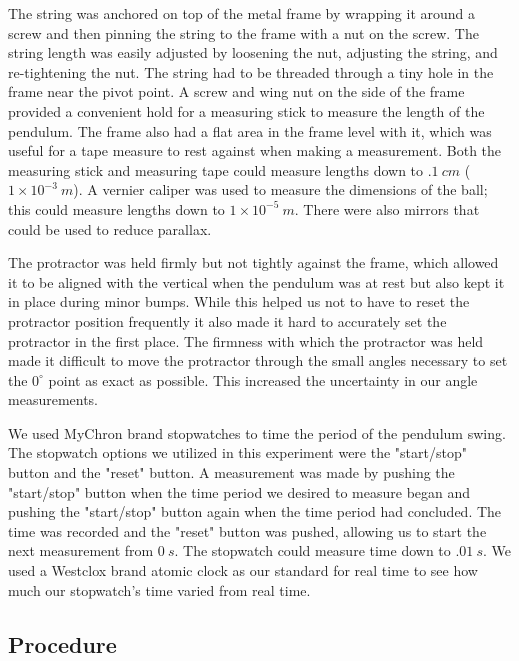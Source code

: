 \documentclass[iop]{emulateapj}
\def\deg{^{\circ}}
\begin{document}
The string was anchored 
on top of the metal frame by wrapping it around a screw and then pinning the 
string to the frame with a nut on the screw.  The string length was easily 
adjusted by loosening the nut, adjusting the string, and re-tightening the 
nut.  The string had to be threaded through a tiny hole in the frame near 
the pivot point. 
A screw and wing nut on the side of the frame provided a convenient hold 
for a measuring stick to measure the length of the pendulum.  The frame also 
had a flat area in the frame level with it, which was useful for a tape 
measure to rest against when making a measurement.  Both the measuring stick 
and measuring tape could measure lengths down to $.1~cm$ 
($1\times 10^{-3}~m$).  A vernier caliper was used to measure the dimensions 
of the ball; this could measure lengths down to $1\times 10^{-5}~m$. There 
were also mirrors that could be used to reduce parallax.

The protractor was held firmly but not tightly against the frame, which 
allowed it to be aligned with the vertical when the pendulum was at rest 
but also 
kept it in place during minor bumps.  While this helped us not to have to 
reset the protractor position frequently it also made it hard to accurately 
set the protractor in the first place. The firmness with which the protractor 
was held made it difficult to move the protractor through the small angles 
necessary to set the $0\deg$ point as exact as possible.  This increased the 
uncertainty in our angle measurements.

We used MyChron brand stopwatches to time the period of the pendulum 
swing.  The stopwatch options we utilized in this experiment were the 
"start/stop" button and the "reset" button. A measurement was made by pushing 
the "start/stop" button when the time period we desired to measure began and 
pushing the "start/stop" button again when the time period had concluded. The 
time was recorded and the "reset" button was pushed, allowing us to start the 
next measurement from $0~s$. The stopwatch could measure time down to 
$.01~s$. 
We used a Westclox brand atomic clock as our standard for real time 
to see how much our stopwatch's time varied from real time.

\subsection{Procedure}
\end{document}
